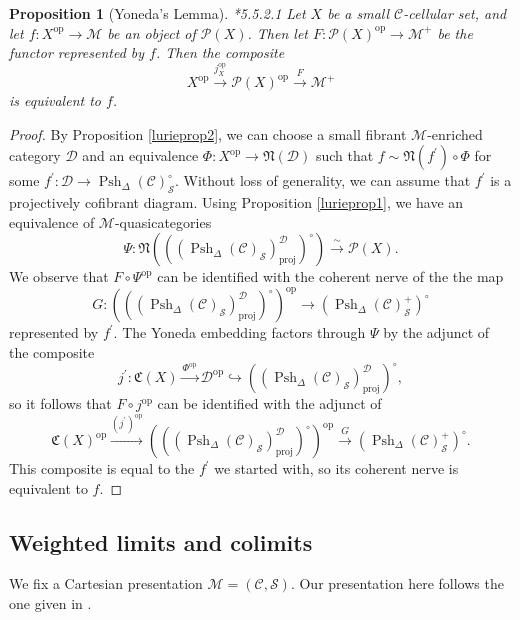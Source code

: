 \documentclass[leqno]{article}
\numberwithin{equation}{subsection}
\theoremstyle{plain}   %
\newtheorem{prop}[equation]{Proposition}
\theoremstyle{remark}
\theoremstyle{plain}
\newcommand{\op}{\ensuremath{\mathrm{op}}}
\newcommand{\C}{\ensuremath{\mathcal{C}}}
\newcommand{\M}{\ensuremath{\mathcal{M}}}
\newcommand{\Pre}{\ensuremath{\mathcal{P}}}
\newcommand{\setS}{\ensuremath{\mathscr{S}}}
\newcommand{\spsh}{\ensuremath{\operatorname{Psh}_\Delta(\mathcal{C})}}
\begin{document}
\begin{prop}[Yoneda's Lemma]\cite{htt}*{5.5.2.1}
	Let \(X\) be a small \(\C\)-cellular set, and let \(f: X^\op \to \M\) be an object of \(\Pre(X)\).  Then let \(F:\Pre(X)^\op \to \M^+\) be the functor represented by \(f\).  Then the composite \[X^\op\xrightarrow{j^\op_X} \Pre(X)^\op \xrightarrow{F} \M^+\] is equivalent to \(f\).
\end{prop}
\begin{proof}
	By Proposition \ref{lurieprop2}, we can choose a small fibrant \(\M\)-enriched category \(\mathcal{D}\) and an equivalence \(\Phi:X^\op\to \mathfrak{N}(\mathcal{D})\) such that \(f\sim \mathfrak{N}(f^\prime) \circ \Phi\) for some \(f^\prime:\mathcal{D} \to \spsh_\setS^\circ\).  Without loss of generality, we can assume that \(f^\prime\) is a projectively cofibrant diagram.  Using Proposition \ref{lurieprop1}, we have an equivalence of \(\M\)-quasicategories 
	\[\Psi:\mathfrak{N}\left(\left((\spsh_\setS)_\mathrm{proj}^\mathcal{D}\right)^\circ\right) \xrightarrow{\sim} \Pre(X).\] 
	We observe that \(F\circ \Psi^\op\) can be identified with the coherent nerve of the the map 
	\[G: \left(\left((\spsh_\setS)_\mathrm{proj}^\mathcal{D}\right)^\circ\right)^\op \to \left(\spsh^{+}_\setS\right)^\circ\] represented by \(f^\prime\).  The Yoneda embedding factors through \(\Psi\) by the adjunct of the composite 
	\[j^\prime:\mathfrak{C}(X)\xrightarrow{\Phi^\op} \mathcal{D}^\op \hookrightarrow \left((\spsh_\setS)_\mathrm{proj}^\mathcal{D}\right)^\circ,\]
	so it follows that \(F\circ j^\op\) can be identified with the adjunct of 
	\[\mathfrak{C}(X)^\op \xrightarrow{(j^\prime)^\op} \left(\left((\spsh_\setS)_\mathrm{proj}^\mathcal{D}\right)^\circ\right)^\op \xrightarrow{G} \left(\spsh^{+}_\setS\right)^\circ.\]
	This composite is equal to the \(f^\prime\) we started with, so its coherent nerve is equivalent to \(f\).
\end{proof}

\subsection{Weighted limits and colimits}
We fix a Cartesian presentation \(\M=(\C,\setS)\).  Our presentation here follows the one given in \cite{nlabwlim}.
\end{document}
